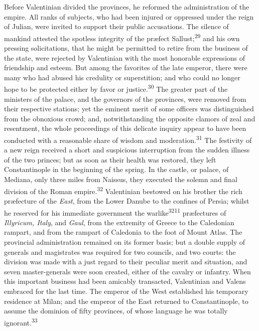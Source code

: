 Before Valentinian divided the provinces, he reformed the
administration of the empire. All ranks of subjects, who had been
injured or oppressed under the reign of Julian, were invited to
support their public accusations. The silence of mankind attested
the spotless integrity of the præfect Sallust;\textsuperscript{29} and his own
pressing solicitations, that he might be permitted to retire from
the business of the state, were rejected by Valentinian with the
most honorable expressions of friendship and esteem. But among
the favorites of the late emperor, there were many who had abused
his credulity or superstition; and who could no longer hope to be
protected either by favor or justice.\textsuperscript{30} The greater part of the
ministers of the palace, and the governors of the provinces, were
removed from their respective stations; yet the eminent merit of
some officers was distinguished from the obnoxious crowd; and,
notwithstanding the opposite clamors of zeal and resentment, the
whole proceedings of this delicate inquiry appear to have been
conducted with a reasonable share of wisdom and moderation.\textsuperscript{31}
The festivity of a new reign received a short and suspicious
interruption from the sudden illness of the two princes; but as
soon as their health was restored, they left Constantinople in
the beginning of the spring. In the castle, or palace, of
Mediana, only three miles from Naissus, they executed the solemn
and final division of the Roman empire.\textsuperscript{32} Valentinian bestowed
on his brother the rich præfecture of the \textit{East}, from the Lower
Danube to the confines of Persia; whilst he reserved for his
immediate government the warlike\textsuperscript{3211} præfectures of \textit{Illyricum,
Italy}, and \textit{Gaul}, from the extremity of Greece to the
Caledonian rampart, and from the rampart of Caledonia to the foot
of Mount Atlas. The provincial administration remained on its
former basis; but a double supply of generals and magistrates was
required for two councils, and two courts: the division was made
with a just regard to their peculiar merit and situation, and
seven master-generals were soon created, either of the cavalry or
infantry. When this important business had been amicably
transacted, Valentinian and Valens embraced for the last time.
The emperor of the West established his temporary residence at
Milan; and the emperor of the East returned to Constantinople, to
assume the dominion of fifty provinces, of whose language he was
totally ignorant.\textsuperscript{33}

